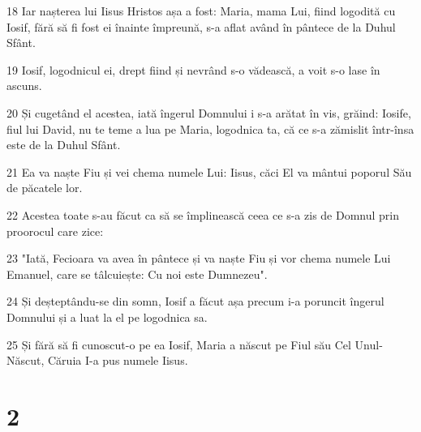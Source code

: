 \par 18 Iar nașterea lui Iisus Hristos așa a fost: Maria, mama Lui, fiind logodită cu Iosif, fără să fi fost ei înainte împreună, s-a aflat având în pântece de la Duhul Sfânt.
\par 19 Iosif, logodnicul ei, drept fiind și nevrând s-o vădească, a voit s-o lase în ascuns.
\par 20 Și cugetând el acestea, iată îngerul Domnului i s-a arătat în vis, grăind: Iosife, fiul lui David, nu te teme a lua pe Maria, logodnica ta, că ce s-a zămislit într-însa este de la Duhul Sfânt.
\par 21 Ea va naște Fiu și vei chema numele Lui: Iisus, căci El va mântui poporul Său de păcatele lor.
\par 22 Acestea toate s-au făcut ca să se împlinească ceea ce s-a zis de Domnul prin proorocul care zice:
\par 23 "Iată, Fecioara va avea în pântece și va naște Fiu și vor chema numele Lui Emanuel, care se tâlcuiește: Cu noi este Dumnezeu".
\par 24 Și deșteptându-se din somn, Iosif a făcut așa precum i-a poruncit îngerul Domnului și a luat la el pe logodnica sa.
\par 25 Și fără să fi cunoscut-o pe ea Iosif, Maria a născut pe Fiul său Cel Unul-Născut, Căruia I-a pus numele Iisus.

\chapter{2}

